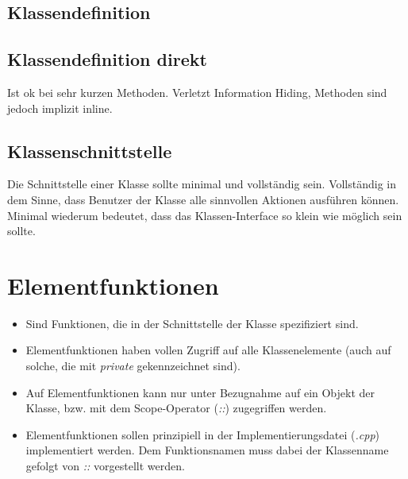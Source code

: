 \begin{multicols}{2}
\subsection{Klassendefinition}
\vspace{-\baselineskip}
\begin{minipage}{\linewidth}
	
\end{minipage}
\vfill\null
\columnbreak
\subsection{Klassendefinition direkt}
\vspace{-\baselineskip}
\begin{minipage}{\linewidth}
	
\end{minipage}
\begin{hinweis}
	Ist ok bei sehr kurzen Methoden. Verletzt Information Hiding, Methoden sind jedoch implizit inline.
\end{hinweis}
\end{multicols}

\subsection{Klassenschnittstelle}
Die Schnittstelle einer Klasse sollte minimal und vollständig sein. Vollständig in dem Sinne, dass Benutzer der Klasse alle sinnvollen Aktionen ausführen können. Minimal wiederum bedeutet, dass das Klassen-Interface so klein wie möglich sein sollte.

\section{Elementfunktionen}
\begin{itemize}
	\item Sind Funktionen, die in der Schnittstelle der Klasse spezifiziert sind.
	\item Elementfunktionen haben vollen Zugriff auf alle Klassenelemente (auch auf solche, die mit \emph{private} gekennzeichnet sind).
	\item Auf Elementfunktionen kann nur unter Bezugnahme auf ein Objekt der Klasse, bzw. mit dem Scope-Operator (\emph{::}) zugegriffen werden.
	\item Elementfunktionen sollen prinzipiell in der Implementierungsdatei (\emph{.cpp}) implementiert werden. Dem Funktionsnamen muss dabei der Klassenname gefolgt von \emph{::} vorgestellt werden.
\end{itemize}


